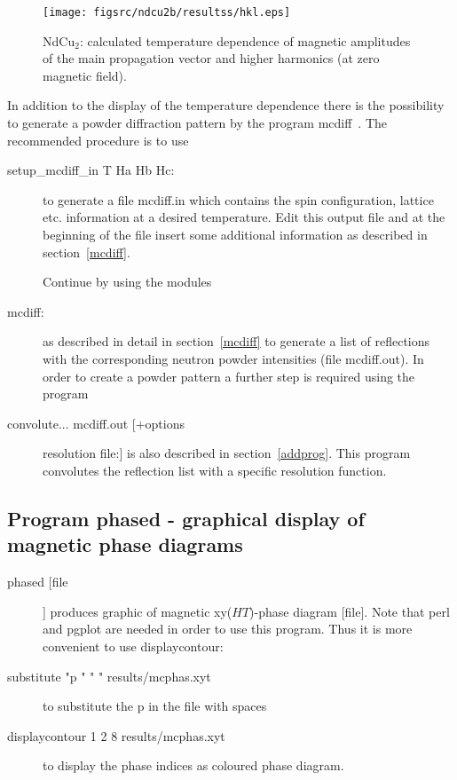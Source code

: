 \begin{figure}[htb]%
\begin{center}\leavevmode
\texttt{[image: figsrc/ndcu2b/resultss/hkl.eps]}
\end{center}
\caption{NdCu$_2$: calculated temperature dependence of magnetic amplitudes of the
main propagation vector and higher harmonics (at zero magnetic field).}
\label{neutintgraphic}
\end{figure}

In addition to the display of the temperature dependence there is the
possibility to generate a powder diffraction pattern by the 
program mcdiff~. The 
recommended procedure is to use 

\begin{description}
\item[{\prg setup\_mcdiff\_in} T Ha Hb Hc:] to generate a file {\prg mcdiff.in} which
contains the spin configuration, lattice etc. information at a
desired temperature. Edit this output file and at the beginning
of the file insert some additional information as described in section~\ref{mcdiff}.

Continue by using  the modules
\item[{\prg mcdiff}:] as described in detail in section~\ref{mcdiff} to
generate a list of reflections with the corresponding neutron powder
intensities (file {\prg mcdiff.out}). In order to create a powder pattern 
a further step is required using the program
\item[{\prg convolute}... mcdiff.out [+options] resolution file:]
  is also described in section~\ref{addprog}. This program convolutes the
reflection list with a specific resolution function.
\end{description}

\clearpage

\subsection{Program {\prg phased} - graphical display of magnetic phase diagrams}
\begin{description}
\item [phased    [file]]       produces graphic of magnetic xy($HT$)-phase diagram [file]. Note that
{\prg perl} and {\prg pgplot} are needed in order to use this program. Thus it is more
convenient to use {\prg displaycontour}:
\item [substitute "p " "  " results/mcphas.xyt] to substitute the p in the file with spaces
\item [displaycontour 1 2 8 results/mcphas.xyt] to display the phase indices as coloured phase diagram.
\end{description}

